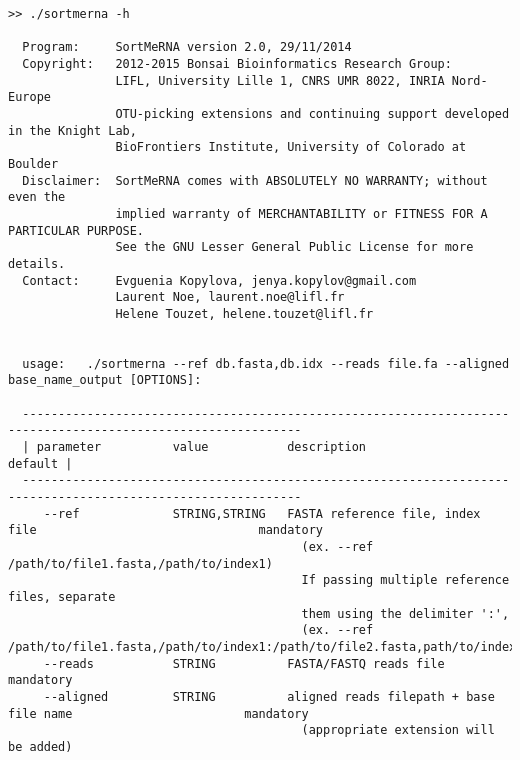 \documentclass[10pt,a4paper]{article}
\begin{document}
\begin{Verbatim}[fontsize=\footnotesize]
>> ./sortmerna -h

  Program:     SortMeRNA version 2.0, 29/11/2014
  Copyright:   2012-2015 Bonsai Bioinformatics Research Group:
               LIFL, University Lille 1, CNRS UMR 8022, INRIA Nord-Europe
               OTU-picking extensions and continuing support developed in the Knight Lab,
               BioFrontiers Institute, University of Colorado at Boulder
  Disclaimer:  SortMeRNA comes with ABSOLUTELY NO WARRANTY; without even the
               implied warranty of MERCHANTABILITY or FITNESS FOR A PARTICULAR PURPOSE.
               See the GNU Lesser General Public License for more details.
  Contact:     Evguenia Kopylova, jenya.kopylov@gmail.com 
               Laurent Noe, laurent.noe@lifl.fr
               Helene Touzet, helene.touzet@lifl.fr


  usage:   ./sortmerna --ref db.fasta,db.idx --reads file.fa --aligned base_name_output [OPTIONS]:

  -------------------------------------------------------------------------------------------------------------
  | parameter          value           description                                                    default |
  -------------------------------------------------------------------------------------------------------------
     --ref             STRING,STRING   FASTA reference file, index file                               mandatory
                                         (ex. --ref /path/to/file1.fasta,/path/to/index1)
                                         If passing multiple reference files, separate 
                                         them using the delimiter ':',
                                         (ex. --ref /path/to/file1.fasta,/path/to/index1:/path/to/file2.fasta,path/to/index2)
     --reads           STRING          FASTA/FASTQ reads file                                         mandatory
     --aligned         STRING          aligned reads filepath + base file name                        mandatory
                                         (appropriate extension will be added)


\end{Verbatim}
\end{document}

